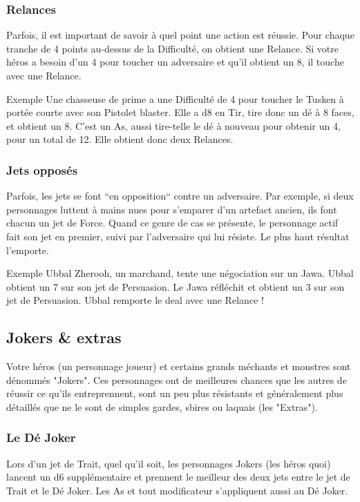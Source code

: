 \subsubsection{Relances}
Parfois, il est important de savoir à quel point une action est réussie. Pour chaque tranche de 4 points au-dessus de la Difficulté, on obtient une Relance. Si votre héros a besoin d’un 4 pour toucher un adversaire et qu’il obtient un 8, il touche avec une Relance.

\begin{commentbox}{Exemple}
Une chasseuse de prime a une Difficulté de 4 pour toucher le Tusken à portée courte avec son Pistolet blaster. Elle a d8 en Tir, tire donc un dé à 8 faces, et obtient un 8. C’est un As, aussi tire-telle le dé à nouveau pour obtenir un 4, pour un total de 12. Elle obtient donc deux Relances.
\end{commentbox}

\subsubsection{Jets opposés}
Parfois, les jets se font “en opposition“ contre un adversaire. Par exemple, si deux personnages luttent à mains nues pour s’emparer d’un artefact ancien, ils font chacun un jet de Force. Quand ce genre de cas se présente, le personnage actif fait son jet en premier, suivi par l’adversaire qui lui résiste. Le plus haut résultat l’emporte.

\begin{commentbox}{Exemple}
Ubbal Zherooh, un marchand, tente une négociation sur un Jawa. Ubbal obtient un 7 sur son jet de Persuasion. Le Jawa réfléchit et obtient un 3 sur son jet de Persuasion. Ubbal remporte le deal avec une Relance !
\end{commentbox}


\subsection{Jokers \& extras}
Votre héros (un personnage joueur) et certains grands méchants et monstres sont dénommés "Jokers". Ces personnages ont de meilleures chances que les autres de réussir ce qu’ils entreprennent, sont un peu plus résistants et généralement plus détaillés que ne le sont de simples gardes, sbires ou laquais (les "Extras").

\subsubsection{Le Dé Joker}
Lors d’un jet de Trait, quel qu’il soit, les personnages Jokers (les héros quoi) lancent un d6 supplémentaire et prennent le meilleur des deux jets entre le jet de Trait et le Dé Joker. Les As et tout modificateur s’appliquent aussi au Dé Joker.

